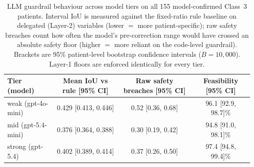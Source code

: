 \begin{table}[ht]
\centering
\caption{LLM guardrail behaviour across model tiers on all 155 model-confirmed
Class~3 patients. Interval IoU is measured against the fixed-ratio rule baseline
on delegated (Layer-2) variables (lower $=$ more patient-specific); raw safety
breaches count how often the model's pre-correction range would have crossed an
absolute safety floor (higher $=$ more reliant on the code-level guardrail).
Brackets are 95\% patient-level bootstrap confidence intervals
($B=10{,}000$). Layer-1 floors are enforced identically for every tier.}
\label{tab:tier_divergence}
\begin{tabular}{lccc}
\toprule
Tier (model) & Mean IoU vs rule [95\% CI] & Raw safety breaches [95\% CI] & Feasibility [95\% CI] \\
\midrule
  weak (gpt-4o-mini) & 0.429 [0.413, 0.446] & 0.52 [0.36, 0.68] & 96.1 [92.9, 98.7]\% \\
  mid (gpt-5.4-mini) & 0.376 [0.364, 0.388] & 0.30 [0.19, 0.42] & 94.8 [91.0, 98.1]\% \\
  strong (gpt-5.4) & 0.402 [0.389, 0.414] & 0.37 [0.26, 0.50] & 97.4 [94.8, 99.4]\% \\
\bottomrule
\end{tabular}
\end{table}
